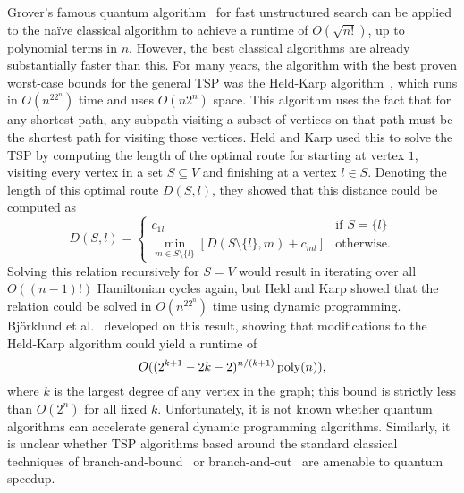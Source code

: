 Grover's famous quantum algorithm~\cite{grover96} for fast unstructured search can be applied to the na\"ive classical algorithm to achieve a runtime of $O(\sqrt{n!})$, up to polynomial terms in $n$. However, the best classical algorithms are already substantially faster than this. For many years, the algorithm with the best proven worst-case bounds for the general TSP was the Held-Karp algorithm~\cite{held1962}, which runs in $O(n^22^n)$ time and uses $O(n2^n)$ space. This algorithm uses the fact that for any shortest path, any subpath visiting a subset of vertices on that path must be the shortest path for visiting those vertices. Held and Karp used this to solve the TSP by computing the length of the optimal route for starting at vertex $1$, visiting every vertex in a set $S \subseteq V$ and finishing at a vertex $l \in S$. Denoting the length of this optimal route $D(S, l)$, they showed that this distance could be computed as
%
\[
D(S, l) = \begin{cases} c_{1l} & \text{if } S = \{l\}\\
          \min_{m \in S \setminus \{l\}}\left[D(S \setminus \{l\}, m) + c_{ml}\right] & \text{otherwise.}
  \end{cases}
\]
%
Solving this relation recursively for $S=V$ would result in iterating over all $O((n-1)!)$ Hamiltonian cycles again, but Held and Karp showed that the relation could be solved in $O(n^22^n)$ time using dynamic programming. Bj{\"o}rklund et al.\ \cite{bjorklund2008} developed on this result, showing that modifications to the Held-Karp algorithm could yield a runtime of
%
\[ O((2^{k + 1} - 2k - 2)^{n/(k + 1)}\operatorname{poly}(n)), \]
%
where $k$ is the largest degree of any vertex in the graph; this bound is strictly less than $O(2^n)$ for all fixed $k$. Unfortunately, it is not known whether quantum algorithms can accelerate general dynamic programming algorithms. Similarly, it is unclear whether TSP algorithms based around the standard classical techniques of branch-and-bound~\cite{little1963} or branch-and-cut~\cite{padberg1991} are amenable to quantum speedup.



